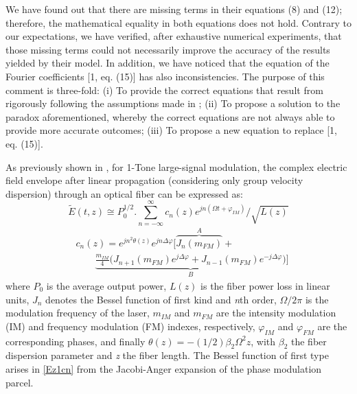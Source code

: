 \documentclass[journal]{IEEEtran}
\begin{document}
We have found out that there are missing terms in their equations (8) and (12); therefore, the mathematical equality in both equations does not hold. Contrary to our expectations, we have verified, after exhaustive numerical experiments, that those missing terms could not necessarily improve the accuracy of the results yielded by their model. In addition, we have noticed that the equation of the Fourier coefficients [1, eq. (15)] has also inconsistencies. The purpose of this comment is three-fold: (i) To provide the correct equations that result from rigorously following the assumptions made in \cite{eva}; (ii) To propose a solution to the paradox aforementioned, whereby the correct equations are not always able to provide more accurate outcomes; (iii) To propose a new equation to replace [1, eq. (15)].

As previously shown in \cite{eva}, for 1-Tone large-signal modulation, the complex electric field envelope after linear propagation (considering only group velocity dispersion) through an optical fiber can be expressed as:
\begin{equation} \label{Ez1}
\tilde{E}(t, z) \cong P_0^{1/2}\bigg.\sum_{n = -\infty}^{\infty} c_n (z)e^{jn(\Omega t + \varphi_{IM})}/\sqrt{L(z)}
\end{equation}
\begin{align} \label{Ez1cn}  \nonumber
&c_n(z) = e^{jn^2\theta(z)}e^{jn\Delta\varphi}\bigg[\overbrace{J_n(m_{FM})}^{A} + \\
& \qquad{} \underbrace{\frac{m_{IM}}{4}\Big(J_{n+1}(m_{FM})e^{j\Delta\varphi} + J_{n-1}(m_{FM})e^{-j\Delta\varphi}\Big)}_{B}\bigg]
\end{align}
where $P_0$  is the average output power, $L(z)$ is the fiber power loss in linear units, $J_n$ denotes the Bessel function of first kind and \emph{n}th order, $\Omega/2\pi$  is the modulation frequency of the laser, $m_{IM}$ and $m_{FM}$  are the intensity modulation (IM) and frequency modulation (FM) indexes, respectively, $\varphi_{IM}$ and $\varphi_{FM}$ are the corresponding phases, and finally $\theta(z) = -(1/2)\beta_2\Omega^2z$, with $\beta_2$ the fiber dispersion parameter and \emph{z} the fiber length. The Bessel function of first type arises in \eqref{Ez1cn} from the Jacobi-Anger expansion of the phase modulation parcel.
\end{document}
